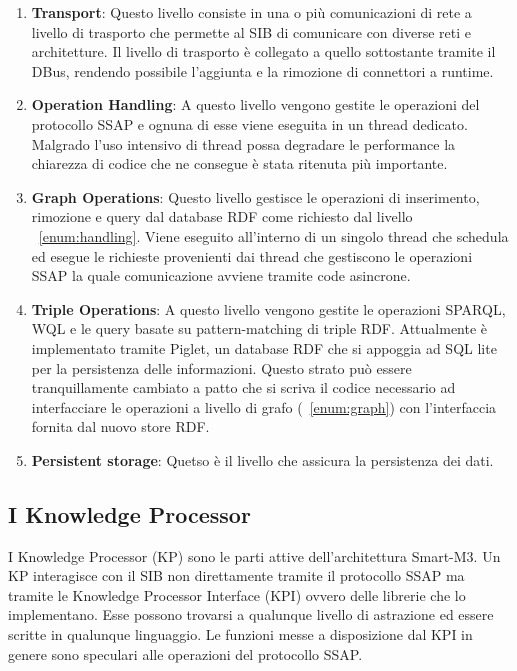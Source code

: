 \begin{enumerate}
	\item \textbf{Transport}: Questo livello consiste in una o più comunicazioni di rete a livello di trasporto che permette al SIB di comunicare con diverse reti e architetture. Il livello di trasporto è collegato a quello sottostante tramite il DBus, rendendo possibile l'aggiunta e la rimozione di connettori a runtime.
	\item \label{enum:handling}\textbf{Operation Handling}: A questo livello vengono gestite le operazioni del protocollo SSAP e ognuna di esse viene eseguita in un thread dedicato. Malgrado l'uso intensivo di thread possa degradare le performance la chiarezza di codice che ne consegue è stata ritenuta più importante.
	\item \label{enum:graph}\textbf{Graph Operations}: Questo livello gestisce le operazioni di inserimento, rimozione e query dal database RDF come richiesto dal livello ~\ref{enum:handling}. Viene eseguito all'interno di un singolo thread che schedula ed esegue le richieste provenienti dai thread che gestiscono le operazioni SSAP la quale comunicazione avviene tramite code asincrone.
	\item \textbf{Triple Operations}: A questo livello vengono gestite le operazioni SPARQL, WQL e le query basate su pattern-matching di triple RDF. Attualmente è implementato tramite Piglet, un database RDF che si appoggia ad SQL lite per la persistenza delle informazioni. Questo strato può essere tranquillamente cambiato a patto che si scriva il codice necessario ad interfacciare le operazioni a livello di grafo (~\ref{enum:graph}) con l'interfaccia fornita dal nuovo store RDF.
	\item \textbf{Persistent storage}: Quetso è il livello che assicura la persistenza dei dati.
\end{enumerate}

\subsection{I Knowledge Processor}

I Knowledge Processor (KP) sono le parti attive dell'architettura Smart-M3. Un KP interagisce con il SIB non direttamente tramite il protocollo SSAP ma tramite le Knowledge Processor Interface (KPI) ovvero delle librerie che lo implementano. Esse possono trovarsi a qualunque livello di astrazione ed essere scritte in qualunque linguaggio. Le funzioni messe a disposizione dal KPI in genere sono speculari alle operazioni del protocollo SSAP.


